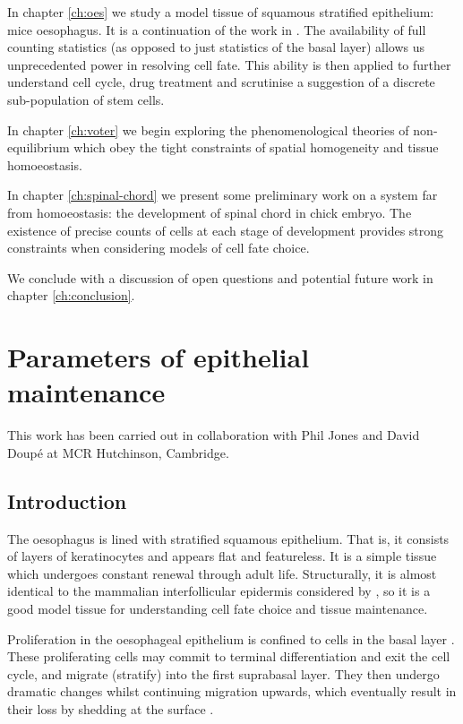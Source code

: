 \documentclass[10pt,english]{report}
\begin{document}
In chapter \ref{ch:oes} we study a model tissue of squamous stratified epithelium: mice oesophagus. It is a continuation of the work in \citet{clayton,klein07}. The availability of full counting statistics (as opposed to just statistics of the basal layer) allows us unprecedented power in resolving cell fate. This ability is then applied to further understand cell cycle, drug treatment and scrutinise a suggestion of a discrete sub-population of stem cells.

In chapter \ref{ch:voter} we begin exploring the phenomenological theories of non-equilibrium which obey the tight constraints of spatial homogeneity and tissue homoeostasis.

In chapter \ref{ch:spinal-chord} we present some preliminary work on a system far from homoeostasis: the development of spinal chord in chick embryo. The existence of precise counts of cells at each stage of development provides strong constraints when considering models of cell fate choice.

We conclude with a discussion of open questions and potential future work in chapter \ref{ch:conclusion}.

\chapter{\label{ch:oes}Parameters of epithelial maintenance}

This work has been carried out in collaboration with Phil Jones and David Doup\'e at MCR Hutchinson, Cambridge.

\section{Introduction}

The oesophagus is lined with stratified squamous epithelium. That is, it consists of layers of keratinocytes and appears flat and featureless. It is a simple tissue which undergoes constant renewal through adult life. Structurally, it is almost identical to the mammalian interfollicular epidermis considered by \citet{clayton}, so it is a good model tissue for understanding cell fate choice and tissue maintenance.

Proliferation in the oesophageal epithelium is confined to cells in the basal layer \citep{leblond}. These proliferating cells may commit to terminal differentiation and exit the cell cycle, and migrate (stratify) into the first suprabasal layer. They then undergo dramatic changes whilst continuing migration upwards, which eventually result in their loss by shedding at the surface \citep{seery}.
\end{document}
